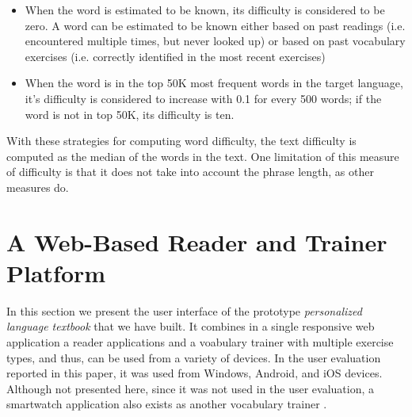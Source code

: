 \begin{itemize}
	\item When the word is estimated to be known, its difficulty is considered to be zero. A word can be estimated to be known either based on past readings (i.e. encountered multiple times, but never looked up) or based on past vocabulary exercises (i.e. correctly identified in the most recent exercises) 
	\item When the word is in the top 50K most frequent words in the target language, it's difficulty is 	considered to increase with 0.1 for every 500 words; if the word is not in top 50K, its difficulty is ten.
\end{itemize}

With these strategies for computing word difficulty, the text difficulty is computed as the median of the words in the text. One limitation of this measure of difficulty is that it does not take into account the phrase length, as other measures do. \cite{Kincaid75-Readability}


\newpage
\section{A Web-Based Reader and Trainer Platform}


	
	In this section we present the user interface of the prototype {\em personalized language textbook} that we have built. It combines in a single responsive web application a reader applications and a voabulary trainer with multiple exercise types, and thus, can be used from a variety of devices. In the user evaluation reported in this paper, it was used from Windows, Android, and iOS devices. Although not presented here, since it was not used in the user evaluation, a smartwatch application also exists as another vocabulary trainer \cite{Nien16-time}.

